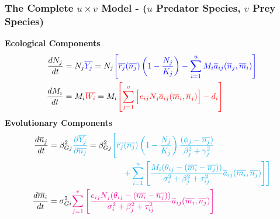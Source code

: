 \documentclass[10pt]{beamer}
\begin{document}
\begin{frame}
	\frametitle{The Complete $u\times v$ Model - \normalsize($u$ Predator Species, $v$ Prey Species)}
	{\bf Ecological Components}
	\begin{align*}
		\frac{dN_j}{dt} &= N_j{\color{blue}\overline{Y_j}} = N_j {\color{blue}\left[{\color{blue}\overline{r_j}(\overline{n_j})\left(1 - \frac{N_j}{K_j}\right) - \sum\limits_{i = 1}^{u}M_i\overline{a}_{ij}(\overline{n}_j, \overline{m}_i)}\right]} \\
		\frac{dM_i}{dt} &= M_i{\color{red}\overline{W_i}} = M_i {\color{red}\left[\sum\limits_{j = 1}^{v}\Big[e_{ij}N_j\overline{a}_{ij}(\overline{m}_i, \overline{n}_j)\Big] - d_i\right]}
	\end{align*}
	{\bf Evolutionary Components}
	\begin{align*}
		\frac{d\overline{n}_j}{dt} &= \beta_{Gj}^2{\color{cyan}\frac{\partial \overline{Y_j}}{\partial \overline{n_j}}} = \beta_{Gj}^2{\color{cyan}\left[\overline{r_j}(\overline{n_j})\left(1 - \frac{N_j}{K_j}\right)\frac{(\phi_j - \overline{n_j})}{\beta_j^2 + \gamma_j^2}\right.}
		\\&\hphantom{\text{mmmmmmmmmmm}}{\left.\color{cyan}+ \sum\limits_{i=1}^{u}\left[\frac{M_i(\theta_{ij} - (\overline{m_i} - \overline{n_j}))}{\sigma_i^2 + \beta_j^2 + \tau_{ij}^2} \overline{a}_{ij}(\overline{m_i}, \overline{n_j})\right]\right]}\\
		\frac{d\overline{m}_i}{dt} &= \sigma_{Gi}^2{\color{magenta}\sum\limits_{j=1}^{v}\left[\frac{e_{ij}N_j(\theta_{ij} - (\overline{m_i} - \overline{n_j}))}{\sigma_i^2 + \beta_j^2 + \tau_{ij}^2} \overline{a}_{ij}(\overline{m_i}, \overline{n_j})\right]}
	\end{align*}
\end{frame}
\end{document}
